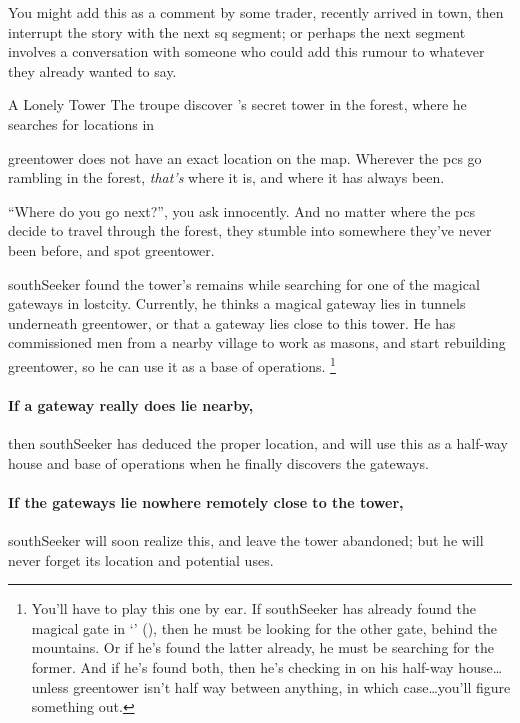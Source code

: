 You might add this as a comment by some trader, recently arrived in town, then interrupt the story with the next \gls{sq} \gls{segment}; or perhaps the next \gls{segment} involves a conversation with someone who could add this rumour to whatever they already wanted to say.

{A Lonely Tower}%
{The troupe discover 's secret tower in the forest, where he searches for locations in }%

\label{green_tower_sq}

\Gls{greentower} does not have an exact location on the map.
Wherever the \glspl{pc} go \gls{rambling} in the forest, \textit{that's} where it is, and where it has always been.

``Where do you go next?'', you ask innocently.
And no matter where the \glspl{pc} decide to travel through the forest, they stumble into somewhere they've never been before, and spot \gls{greentower}.

\begin{exampletext}
  \Gls{southSeeker} found the tower's remains while searching for one of the magical gateways in \gls{lostcity}.
  Currently, he thinks a magical gateway lies in tunnels underneath \gls{greentower}, or that a gateway lies close to this tower.
  He has commissioned men from a nearby \gls{village} to work as masons, and start rebuilding \gls{greentower}, so he can use it as a base of operations.%
  \footnote{You'll have to play this one by ear.
  If \gls{southSeeker} has already found the magical gate in `' (), then he must be looking for the other gate, behind the mountains.
  Or if he's found the latter already, he must be searching for the former.
  And if he's found both, then he's checking in on his half-way house\ldots unless \gls{greentower} isn't half way between anything, in which case\ldots you'll figure something out.}
\end{exampletext}

\paragraph{If a gateway really does lie nearby,}
then \gls{southSeeker} has deduced the proper location, and will use this as a half-way house and base of operations when he finally discovers the gateways.

\paragraph{If the gateways lie nowhere remotely close to the tower,}
\gls{southSeeker} will soon realize this, and leave the tower abandoned; but he will never forget its location and potential uses.

